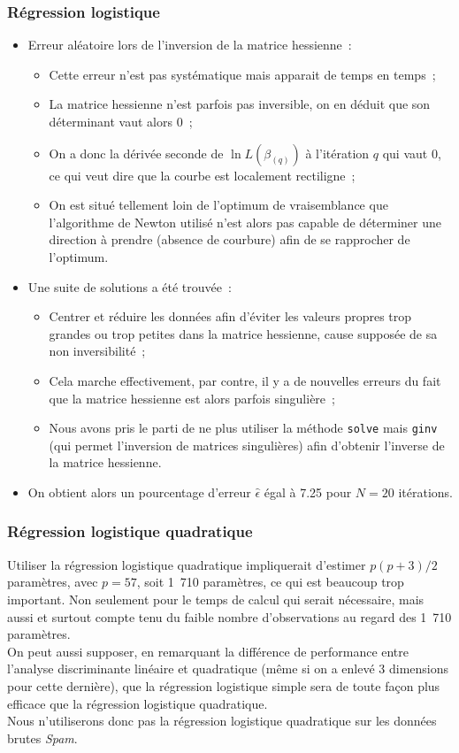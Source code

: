 \documentclass[a4paper,10pt]{report}
\begin{document}
\subsubsection{Régression logistique}
\begin{itemize}
	\item Erreur aléatoire lors de l'inversion de la matrice hessienne~:
	\begin{itemize}
		\item Cette erreur n'est pas systématique mais apparait de temps en temps~;
		\item La matrice hessienne n'est parfois pas inversible, on en déduit que son déterminant vaut alors 0~;
		\item On a donc la dérivée seconde de $\ln L(\beta_{(q)})$ à l'itération $q$ qui vaut 0, ce qui veut dire que la courbe est localement rectiligne~;
		\item On est situé tellement loin de l'optimum de vraisemblance que l'algorithme de Newton utilisé n'est alors pas capable de déterminer une direction à prendre (absence de courbure) afin de se rapprocher de l'optimum.
	\end{itemize}
	\item Une suite de solutions a été trouvée~:
	\begin{itemize}
		\item Centrer et réduire les données afin d'éviter les valeurs propres trop grandes ou trop petites dans la matrice hessienne, cause supposée de sa non inversibilité~;
		\item Cela marche effectivement, par contre, il y a de nouvelles erreurs du fait que la matrice hessienne est alors parfois singulière~;
		\item Nous avons pris le parti de ne plus utiliser la méthode \texttt{solve} mais \texttt{ginv} (qui permet l'inversion de matrices singulières) afin d'obtenir l'inverse de la matrice hessienne.
	\end{itemize}
	\item On obtient alors un pourcentage d'erreur $\hat{\epsilon}$ égal à 7.25 pour $N = 20$ itérations.
\end{itemize}


\subsubsection{Régression logistique quadratique}

Utiliser la régression logistique quadratique impliquerait d'estimer $p(p+3)/2$ paramètres, avec $p=57$, soit 1~710 paramètres, ce qui est beaucoup trop important. Non seulement pour le temps de calcul qui serait nécessaire, mais aussi et surtout compte tenu du faible nombre d'observations au regard des 1~710 paramètres.\\
On peut aussi supposer, en remarquant la différence de performance entre l'analyse discriminante linéaire et quadratique (même si on a enlevé 3 dimensions pour cette dernière), que la régression logistique simple sera de toute façon plus efficace que la régression logistique quadratique.\\
Nous n'utiliserons donc pas la régression logistique quadratique sur les données brutes \textit{Spam}.
\end{document}
